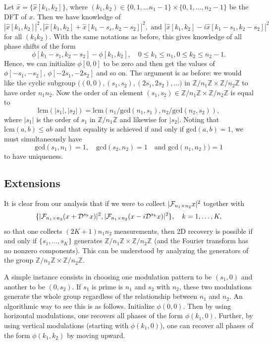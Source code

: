 \documentclass[11pt]{article}
\newcommand{\Z}{\mathbb{Z}}
\newcommand{\<}{\langle}
\renewcommand{\>}{\rangle}
\numberwithin{equation}{section}
\begin{document}
Let $\hat{x} = \{\hat x [k_1,k_2]\}$, where $(k_1, k_2) \in \{0, 1,
\ldots n_1 - 1\} \times \{0, 1, \ldots, n_2-1\}$ be the DFT of $x$.
Then we have knowledge of 
\[
|\hat{x}[k_1,k_2]|^2, |\hat x[k_1,k_2] + \hat{x}[k_1-s_s, k_2 -
s_2]|^2, \text{ and } |\hat x[k_1,k_2] -i \hat{x}[k_1-s_1, k_2-s_2]|^2
\]
for all $(k_1 k_2)$. With the same notations as before, this gives 
knowledge of all phase shifts of the form
\[
\phi[k_1-s_1, k_2 - s_2] - \phi[k_1,k_2], \quad 0 \le k_1 \le n_1,
0\le k_2 \le n_2 -1. 
\]
Hence, we can initialize $\phi[0,0]$ to be zero and then get the
values of $\phi[-s_1, -s_2]$, $\phi[-2s_1, -2s_2]$ and so on. The
argument is as before: we would like the cyclic subgroup $\bigl(
(0,0), (s_1, s_2), (2s_1, 2s_2), \ldots \bigr)$ in $\Z/n_1 \Z \times
\Z/n_2 \Z$ to have order $n_1 n_2$. Now the order of an element $(s_1,
s_2) \in \Z/n_1 \Z \times \Z/n_2 \Z$ is equal to
\[
\text{lcm}(|s_1|, |s_2|) = \text{lcm}(n_1/\text{gcd}(n_1,s_1),
n_2/\text{gcd}(n_2,s_2)), 
\]
where $|s_1|$ is the order of $s_1$ in $\Z/n_1 \Z$ and likewise for
$|s_2|$.  Noting that $\text{lcm}(a, b) \le ab$ and that equality is
achieved if and only if $\text{gcd}(a, b) = 1$, we must simultaneously
have 
\[
\text{gcd}(s_1, n_1) = 1, \quad \text{gcd}(s_2, n_2) = 1 \quad \text{and }
\text{gcd}(n_1,n_2)) = 1
\]
to have uniqueness.

\subsection{Extensions}
\label{sec:ext}

It is clear from our analysis that if we were to collect
$|\mathcal{F}_{n_1\times n_2} x|^2$ together with
\[
\{|\mathcal{F}_{n_1 \times n_2} (x + \mathcal{D}^{s_k} x)|^2, |\mathcal{F}_{n_1 \times
  n_2} (x - i\mathcal{D}^{s_k} x)|^2\}, \quad k = 1, \ldots, K, 
\]
so that one collects $(2K+1)n_1 n_2$ measurements, then 2D recovery is
possible if and only if $\{s_1, \ldots, s_K\}$ generates $\Z/n_1 \Z
\times \Z/n_2 \Z$ (and the Fourier transform has no nonzero
components). This can be understood by analyzing the generators of the
group $\Z/n_1 \Z \times \Z/n_2 \Z$.

A simple instance consists in choosing one modulation pattern to be
$(s_1, 0)$ and another to be $(0,s_2)$. If $s_1$ is prime is $n_1$ and
$s_2$ with $n_2$, these two modulations generate the whole group
regardless of the relationship between $n_1$ and $n_2$. An algorithmic
way to see this is as follows. Initialize $\phi(0,0)$. Then by using
horizontal modulations, one recovers all phases of the form
$\phi(k_1,0)$. Further, by using vertical modulations (starting with
$\phi(k_1,0)$), one can recover all phases of the form $\phi(k_1,k_2)$
by moving upward.
\end{document}
